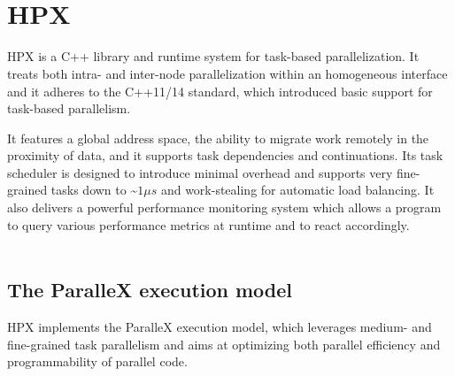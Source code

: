 
~\\~
\section{HPX} \label{sec:hpx}
\enlargethispage{2.5\baselineskip} %
HPX is a C++ library and runtime system for task-based parallelization. It treats both intra- and inter-node parallelization within an homogeneous interface and it adheres to the C++11/14 standard, which introduced basic support for task-based parallelism.

It features a global address space, the ability to migrate work remotely in the proximity of data, and it supports task dependencies and continuations.
Its task scheduler is designed to introduce minimal overhead and supports very fine-grained tasks down to \textasciitilde$1\mu s$\cite{grubel2016using} and work-stealing for automatic load balancing.
It also delivers a powerful performance monitoring system which allows a program to query various performance metrics at runtime and to react accordingly.
~\\~

\subsection{The ParalleX execution model}\label{subs:parallexModel}
HPX implements the ParalleX \cite{kaiser2009parallex} execution model, which leverages medium- and fine-grained task parallelism and aims at optimizing both parallel efficiency and programmability of parallel code.

